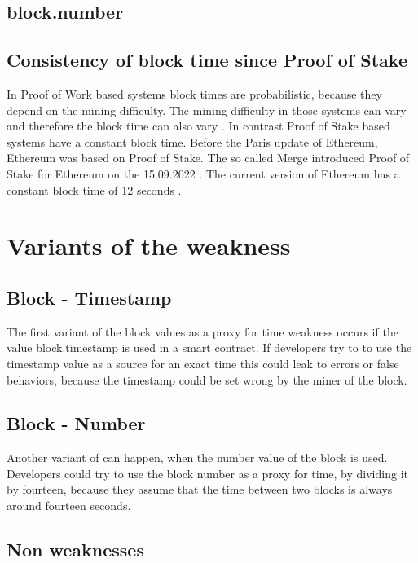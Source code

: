 \documentclass{article}
\begin{document}
\subsection{block.number}



\subsection{Consistency of block time since Proof of Stake}
In Proof of Work based systems block times are probabilistic, because they depend on the mining difficulty.
The mining difficulty in those systems can vary and therefore the block time can also vary \cite{eth_blocks}. \newline
In contrast Proof of Stake based systems have a constant block time.
Before the Paris update of Ethereum, Ethereum was based on Proof of Stake. The so called Merge introduced Proof of Stake for Ethereum
on the 15.09.2022 \cite{eth_history}. The current version of Ethereum has a constant block time of 12 seconds \cite{eth_blocks}.

\section{Variants of the weakness}

\subsection{Block - Timestamp}
The first variant of the block values as a proxy for time weakness occurs if the value block.timestamp is used in a smart contract.
If developers try to to use the timestamp value as a source for an exact time this could leak to errors or false behaviors, because 
the timestamp could be set wrong by the miner of the block.

\subsection{Block - Number}
Another variant of can happen, when the number value of the block is used. Developers could try to use the block number as a proxy for time,
by dividing it by fourteen, because they assume that the time between two blocks is always around fourteen seconds.

\subsection{Non weaknesses}
\end{document}
